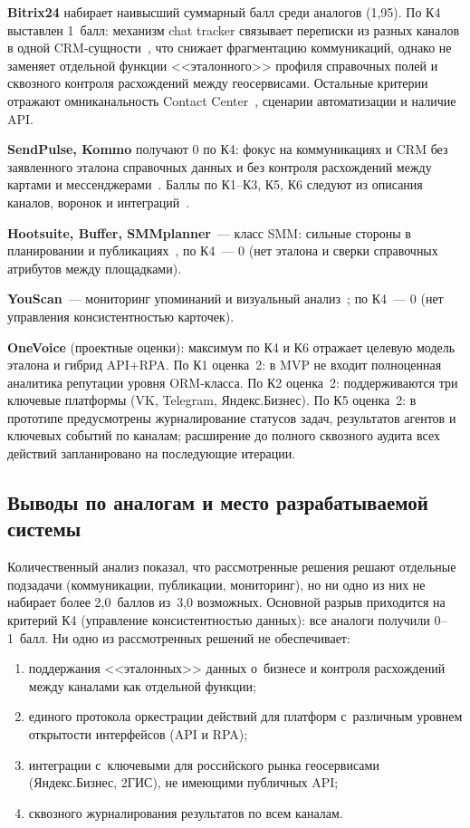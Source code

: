 \textbf{Bitrix24} набирает наивысший суммарный балл среди аналогов (1{,}95). По К4 выставлен 1~балл: механизм chat tracker связывает переписки из разных каналов в одной CRM-сущности~\cite{src:13}, что снижает фрагментацию коммуникаций, однако не заменяет отдельной функции <<эталонного>> профиля справочных полей и сквозного контроля расхождений между геосервисами. Остальные критерии отражают омниканальность Contact Center~\cite{src:24, src:25}, сценарии автоматизации и наличие API.

\textbf{SendPulse, Kommo} получают 0 по К4: фокус на коммуникациях и CRM без заявленного эталона справочных данных и без контроля расхождений между картами и мессенджерами~\cite{src:14, src:34}. Баллы по К1--К3, К5, К6 следуют из описания каналов, воронок и интеграций~\cite{src:11, src:14, src:34}.

\textbf{Hootsuite, Buffer, SMMplanner}~--- класс SMM: сильные стороны в планировании и публикациях~\cite{src:26, src:27, src:28, src:29, src:30, src:31}, по К4~--- 0 (нет эталона и сверки справочных атрибутов между площадками).

\textbf{YouScan}~--- мониторинг упоминаний и визуальный анализ~\cite{src:32, src:33}; по К4~--- 0 (нет управления консистентностью карточек).

\textbf{OneVoice} (проектные оценки): максимум по К4 и К6 отражает целевую модель эталона и гибрид API+RPA. По К1 оценка~2: в MVP не входит полноценная аналитика репутации уровня ORM-класса. По К2 оценка~2: поддерживаются три ключевые платформы (VK, Telegram, Яндекс.Бизнес). По К5 оценка~2: в прототипе предусмотрены журналирование статусов задач, результатов агентов и ключевых событий по каналам; расширение до полного сквозного аудита всех действий запланировано на последующие итерации.

\subsection{Выводы по аналогам и место разрабатываемой системы}
\label{subsec:analogues-conclusion}

Количественный анализ показал, что рассмотренные решения решают отдельные подзадачи (коммуникации, публикации, мониторинг), но ни одно из них не набирает более 2{,}0~баллов из~3{,}0 возможных. Основной разрыв приходится на критерий К4 (управление консистентностью данных): все аналоги получили 0--1~балл. Ни одно из рассмотренных решений не обеспечивает:

\begin{enumerate}
  \item поддержания <<эталонных>> данных о~бизнесе и контроля расхождений между каналами как отдельной функции;
  \item единого протокола оркестрации действий для платформ с~различным уровнем открытости интерфейсов (API и RPA);
  \item интеграции с~ключевыми для российского рынка геосервисами (Яндекс.Бизнес, 2ГИС), не имеющими публичных API;
  \item сквозного журналирования результатов по всем каналам.
\end{enumerate}

